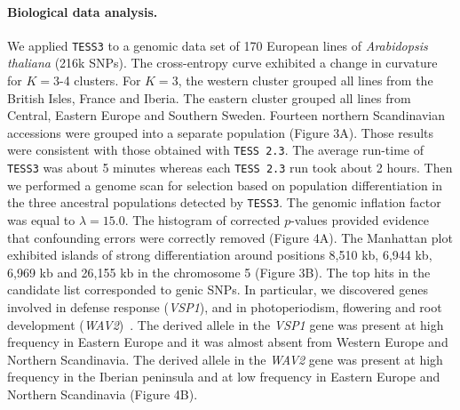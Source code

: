 \paragraph{Biological data analysis.}
We applied {\tt TESS3} to a genomic data set of 170 European lines of {\it Arabidopsis thaliana} (216k SNPs). The cross-entropy curve exhibited a change in curvature for $K = 3$-4 clusters. For $K = 3$, the western cluster grouped all lines from the British Isles, France and Iberia. The eastern cluster grouped all lines from Central, Eastern Europe and Southern Sweden. Fourteen northern Scandinavian accessions were grouped into a separate population (Figure 3A). Those results were consistent with those obtained with {\tt TESS 2.3}. The average run-time of {\tt TESS3} was about 5 minutes whereas each {\tt TESS 2.3} run took about 2 hours. Then we performed a genome scan for selection based on population differentiation in the three ancestral populations detected by {\tt TESS3}. The genomic inflation factor was equal to $\lambda = 15.0$. The histogram of corrected $p$-values provided evidence that confounding errors were correctly removed (Figure 4A).  The Manhattan plot exhibited islands of strong differentiation around positions 8,510 kb, 6,944 kb, 6,969 kb and 26,155 kb in the chromosome 5 (Figure 3B). The top hits in the candidate list corresponded to genic SNPs. In particular, we discovered genes involved in defense response ({\it VSP1}), and in photoperiodism, flowering and root development ({\it WAV2})~\citep{mochizuki2005arabidopsis}. The derived allele in the {\it VSP1} gene was present at high frequency in Eastern Europe and it was almost absent from Western Europe and Northern Scandinavia. The derived allele in the {\it WAV2} gene was present at high frequency in the Iberian peninsula and at low frequency in Eastern Europe and Northern Scandinavia (Figure 4B). 


